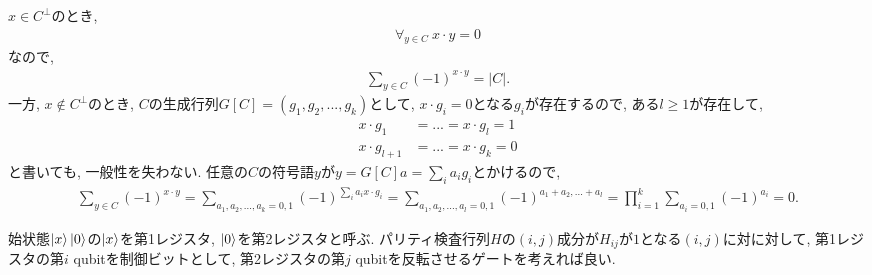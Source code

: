 \begin{ex}
    \label{ex10.25}
    $x \in C^\perp$のとき,
    \begin{align*}
        \forall_{y \in C} \ x \cdot y = 0
    \end{align*}
    なので,
    \begin{align*}
        \sum_{y \in C} (-1)^{x \cdot y } = |C|.
    \end{align*}
    一方, $x \notin C^\perp$のとき, $C$の生成行列$G[C] = \left( g_1, g_2, ..., g_k\right)$として,
    $x \cdot g_i = 0$となる$g_i$が存在するので, ある$l \ge 1$が存在して,
    \begin{align*}
        x \cdot g_1     & = ... = x \cdot g_l = 1 \\
        x \cdot g_{l+1} & = ... = x \cdot g_k = 0
    \end{align*}
    と書いても, 一般性を失わない.
    任意の$C$の符号語$y$が$ y = G[C] a = \sum_i a_i g_i$とかけるので,
    \begin{align*}
        \sum_{y \in C} (-1)^{x \cdot y} = \sum_{a_1, a_2, ..., a_k = 0,1}  (-1)^{\sum_i a_i x \cdot g_i}
        = \sum_{a_1, a_2, ... , a_l = 0, 1}  (-1)^{a_1 + a_2, ... + a_l} = \prod_{i=1}^k \sum_{a_i = 0, 1} (-1)^{a_i} = 0.
    \end{align*}
\end{ex}

\begin{ex}
    \label{ex10.26}
    始状態$\ket{x}\ket{0}$の$\ket{x}$を第1レジスタ, $\ket{0}$を第2レジスタと呼ぶ.
    パリティ検査行列$H$の$(i,j)$成分が$H_{ij}$が$1$となる$(i,j)$に対に対して,
    第1レジスタの第$i$ qubitを制御ビットとして, 第2レジスタの第$j$ qubitを反転させるゲートを考えれば良い.
\end{ex}

\begin{ex}
    \label{ex10.27}
\end{ex}

